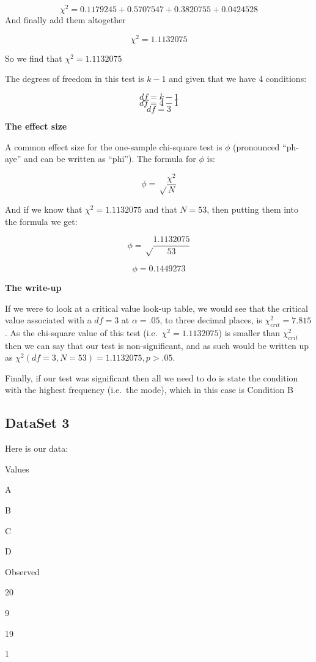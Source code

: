\documentclass[
  oneside]{book}
\begin{document}
\[\chi^2 = {0.1179245}+{0.5707547}+{0.3820755}+{0.0424528}\]
And finally add them altogether

\[\chi^2 = 1.1132075\]

So we find that \(\chi^2 = 1.1132075\)

The degrees of freedom in this test is \(k - 1\) and given that we have 4 conditions:

\[df = k - 1\]
\[df = 4 - 1\]
\[df = 3\]

\textbf{The effect size}

A common effect size for the one-sample chi-square test is \(\phi\) (pronounced ``ph-aye'' and can be written as ``phi''). The formula for \(\phi\) is:

\[\phi = \sqrt\frac{\chi^2}{N}\]

And if we know that \(\chi^2 =1.1132075\) and that \(N = 53\), then putting them into the formula we get:

\[\phi = \sqrt\frac{1.1132075}{53}\]

\[\phi = 0.1449273\]

\textbf{The write-up}

If we were to look at a critical value look-up table, we would see that the critical value associated with a \(df = 3\) at \(\alpha = .05\), to three decimal places, is \(\chi^2_{crit} = 7.815\). As the chi-square value of this test (i.e.~\(\chi^2 = 1.1132075\)) is smaller than \(\chi^2_{crit}\) then we can say that our test is non-significant, and as such would be written up as \(\chi^2(df = 3, N = 53) = 1.1132075,p > .05\).

Finally, if our test was significant then all we need to do is state the condition with the highest frequency (i.e.~the mode), which in this case is Condition B

\hypertarget{dataset-3}{%
\subsection{DataSet 3}\label{dataset-3}}

Here is our data:

Values

A

B

C

D

Observed

20

9

19

1
\end{document}
